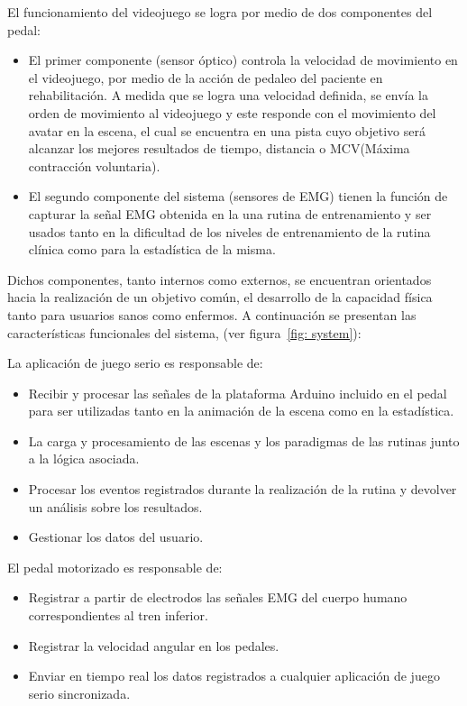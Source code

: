 El funcionamiento del videojuego se logra por medio de dos componentes del pedal:
\begin{itemize}
    \item El primer componente (sensor óptico) controla la velocidad de movimiento en el videojuego, por
    medio de la acción de pedaleo del paciente en rehabilitación. A medida
    que se logra una velocidad definida, se envía la orden de movimiento al videojuego y 
    este responde con el movimiento del avatar en la escena, el cual se encuentra en una pista 
    cuyo objetivo será alcanzar los mejores resultados de tiempo, distancia o  MCV(Máxima contracción voluntaria).
    \item El segundo componente del sistema (sensores de EMG) tienen la función de capturar la señal EMG obtenida en la 
    una rutina de entrenamiento y ser usados tanto en la dificultad de los niveles de entrenamiento de la rutina clínica como para la 
    estadística de la misma.
\end{itemize}
    
Dichos componentes, tanto internos como externos, se encuentran orientados hacia 
la realización de un objetivo común, el desarrollo de la capacidad física tanto para usuarios 
sanos como enfermos. A continuación se presentan las características funcionales 
del sistema, (ver figura~\ref{fig: system}):

\vspace{5pt}
La aplicación de juego serio es responsable de:
\begin{itemize}
    \item Recibir y procesar las señales de la plataforma Arduino incluido en el pedal para ser utilizadas tanto en la 
            animación de la escena como en la estadística.
    \item La carga y procesamiento de las escenas y los paradigmas de las rutinas junto a la lógica asociada. 
    \item Procesar los eventos registrados durante la realización de la rutina y devolver un análisis sobre los resultados.
    \item Gestionar los datos del usuario.
\end{itemize}

\vspace{5pt}
El pedal motorizado es responsable de:
\begin{itemize}
    \item Registrar a partir de electrodos las señales EMG del cuerpo humano correspondientes al tren inferior.
    \item Registrar la velocidad angular en los pedales.
    \item Enviar en tiempo real los datos registrados a cualquier aplicación de juego serio sincronizada.
\end{itemize}
    
